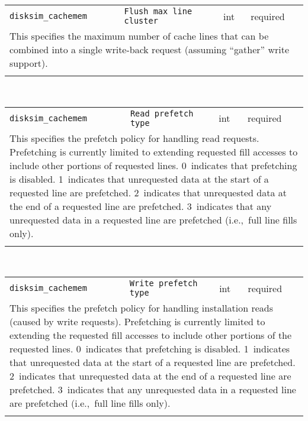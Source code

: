 \noindent 
\begin{tabular}{|p{1.5in}|p{3.5in}|p{0.5in}|p{0.5in}|}
\cline{1-4}
\texttt{disksim\_cachemem} & \texttt{Flush max line cluster} & int & required \\ 
\cline{1-4}
\multicolumn{4}{|p{6in}|}{
This specifies the maximum number of cache lines that can be combined into
a single write-back request (assuming ``gather'' write support).
}\\ 
\cline{1-4}
\multicolumn{4}{p{5in}}{}\\
\end{tabular}\\ 
\noindent 
\begin{tabular}{|p{1.5in}|p{3.5in}|p{0.5in}|p{0.5in}|}
\cline{1-4}
\texttt{disksim\_cachemem} & \texttt{Read prefetch type} & int & required \\ 
\cline{1-4}
\multicolumn{4}{|p{6in}|}{
This specifies the prefetch policy for handling read requests.
Prefetching is currently limited to extending requested fill accesses
to include other portions of requested lines.
0~indicates that prefetching is disabled.
1~indicates that unrequested data at the start of a requested line are
prefetched.
2~indicates that unrequested data at the end of a requested line are
prefetched.
3~indicates that any unrequested data in a requested line are
prefetched (i.e.,~full line fills only).
}\\ 
\cline{1-4}
\multicolumn{4}{p{5in}}{}\\
\end{tabular}\\ 
\noindent 
\begin{tabular}{|p{1.5in}|p{3.5in}|p{0.5in}|p{0.5in}|}
\cline{1-4}
\texttt{disksim\_cachemem} & \texttt{Write prefetch type} & int & required \\ 
\cline{1-4}
\multicolumn{4}{|p{6in}|}{
This specifies the prefetch policy for handling installation reads (caused
by write requests). Prefetching is currently limited to extending the
requested fill accesses to include other portions of the requested
lines.
0~indicates that prefetching is disabled.
1~indicates that unrequested data at the start of a requested line are
prefetched.
2~indicates that unrequested data at the end of a requested line are
prefetched.
3~indicates that any unrequested data in a requested line are
prefetched (i.e.,~full line fills only).
}\\ 
\cline{1-4}
\multicolumn{4}{p{5in}}{}\\
\end{tabular}\\ 
